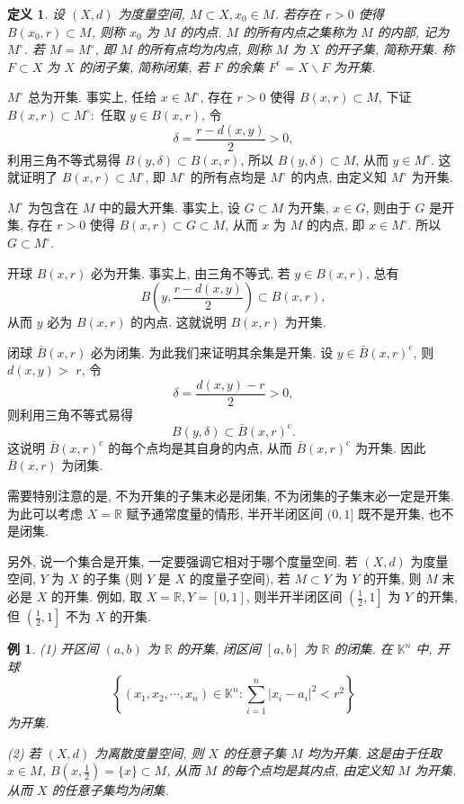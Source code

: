 \documentclass[openany]{ctexbook}
\theoremstyle{kaiti}
\newtheorem{definition}{定义}[section]
\theoremstyle{normal}
\newtheorem{example}{例}[section]
\begin{document}
\begin{definition}
  设 $(X, d)$ 为度量空间, $M \subset X, x_0 \in M$. 若存在 $r>0$ 使得 $B\left(x_0, r\right) \subset M$, 则称 $x_0$ 为 $M$ 的内点. $M$ 的所有内点之集称为 $M$ 的内部, 记为 $M^{\circ}$. 若 $M=M^{\circ}$, 即 $M$ 的所有点均为内点, 则称 $M$ 为 $X$ 的开子集, 简称开集. 称 $F \subset X$ 为 $X$ 的闭子集, 简称闭集, 若 $F$ 的余集 $F^{\mathrm{c}}=X \backslash F$ 为开集.
\end{definition}

$M^{\circ}$ 总为开集. 事实上, 任给 $x \in M^{\circ}$, 存在 $r>0$ 使得 $B(x, r) \subset M$, 下证 $B(x, r) \subset M^{\circ}:$ 任取 $y \in B(x, r)$, 令
$$
\delta=\frac{r-d(x, y)}{2}>0,
$$
利用三角不等式易得 $B(y, \delta) \subset B(x, r)$, 所以 $B(y, \delta) \subset M$, 从而 $y \in M^{\circ}$. 这就证明了 $B(x, r) \subset M^{\circ}$, 即 $M^{\circ}$ 的所有点均是 $M^{\circ}$ 的内点, 由定义知 $M^{\circ}$ 为开集.

$M^{\circ}$ 为包含在 $M$ 中的最大开集. 事实上, 设 $G \subset M$ 为开集, $x \in G$, 则由于 $G$ 是开集, 存在 $r>0$ 使得 $B(x, r) \subset G \subset M$, 从而 $x$ 为 $M$ 的内点, 即 $x \in M^{\circ}$. 所以 $G \subset M^{\circ}$. 

开球 $B(x, r)$ 必为开集. 事实上, 由三角不等式, 若 $y \in B(x, r)$, 总有
$$
B\left(y, \frac{r-d(x, y)}{2}\right) \subset B(x, r),
$$
从而 $y$ 必为 $B(x, r)$ 的内点. 这就说明 $B(x, r)$ 为开集.

闭球 $\bar{B}(x, r)$ 必为闭集. 为此我们来证明其余集是开集. 设 $y \in \bar{B}(x, r)^{\mathrm{c}}$, 则 $d(x, y)>$ $r$, 令
$$
\delta=\frac{d(x, y)-r}{2}>0,
$$
则利用三角不等式易得
$$
B(y, \delta) \subset \bar{B}(x, r)^{\mathrm{c}}.
$$
这说明 $\bar{B}(x, r)^{\mathrm{c}}$ 的每个点均是其自身的内点, 从而 $\bar{B}(x, r)^{\mathrm{c}}$ 为开集. 因此 $\bar{B}(x, r)$ 为闭集.

需要特别注意的是, 不为开集的子集末必是闭集, 不为闭集的子集末必一定是开集. 为此可以考虑 $X=\mathbb{R}$ 赋予通常度量的情形, 半开半闭区间 $(0,1]$ 既不是开集, 也不是闭集.

另外, 说一个集合是开集, 一定要强调它相对于哪个度量空间. 若 $(X, d)$ 为度量空间, $Y$ 为 $X$ 的子集 (则 $Y$ 是 $X$ 的度量子空间), 若 $M \subset Y$ 为 $Y$ 的开集, 则 $M$ 末必是 $X$ 的开集. 例如, 取 $X=\mathbb{R}, Y=[0,1]$, 则半开半闭区间 $\left(\frac{1}{2}, 1\right]$ 为 $Y$ 的开集, 但 $\left(\frac{1}{2}, 1\right]$ 不为 $X$ 的开集.

\begin{example}
(1) 开区间 $(a, b)$ 为 $\mathbb{R}$ 的开集, 闭区间 $[a, b]$ 为 $\mathbb{R}$ 的闭集. 在 $\mathbb{K}^n$ 中, 开球
$$
\left\{\left(x_1, x_2, \cdots, x_n\right) \in \mathbb{K}^n: \sum_{i=1}^n\left|x_{i}-a_{i}\right|^2<r^2\right\}
$$
为开集.

(2) 若 $(X, d)$ 为离散度量空间, 则 $X$ 的任意子集 $M$ 均为开集. 这是由于任取 $x \in M$, $B\left(x, \frac{1}{2}\right)=\{x\} \subset M$, 从而 $M$ 的每个点均是其内点, 由定义知 $M$ 为开集. 从而 $X$ 的任意子集均为闭集.
\end{example}
\end{document}
